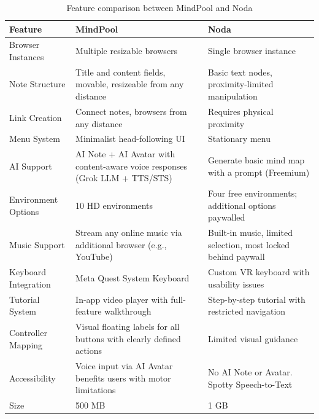 \documentclass{CPP}
\begin{document}
\begin{table}[h]
    \centering
    \caption{Feature comparison between MindPool and Noda}
    \label{tab:noda-comparison}
    \begin{tabular}{|p{3cm}|p{7cm}|p{5cm}|}
        \hline
        \textbf{Feature} & \textbf{MindPool} & \textbf{Noda} \\
        \hline
        Browser Instances & Multiple resizable browsers & Single browser instance \\
        \hline
        Note Structure & Title and content fields, movable, resizeable from any distance & Basic text nodes, proximity-limited manipulation \\
        \hline
        Link Creation & Connect notes, browsers from any distance & Requires physical proximity \\
        \hline
        Menu System & Minimalist head-following UI & Stationary menu \\
        \hline
        AI Support & AI Note + AI Avatar with content-aware voice responses (Grok LLM + TTS/STS) & Generate basic mind map with a prompt (Freemium) \\
        \hline
        Environment Options & 10 HD environments & Four free environments; additional options paywalled \\
        \hline
        Music Support & Stream any online music via additional browser (e.g., YouTube) & Built-in music, limited selection, most locked behind paywall \\
        \hline
        Keyboard Integration & Meta Quest System Keyboard & Custom VR keyboard with usability issues \\
        \hline
        Tutorial System & In-app video player with full-feature walkthrough & Step-by-step tutorial with restricted navigation \\
        \hline
        Controller Mapping & Visual floating labels for all buttons with clearly defined actions & Limited visual guidance \\
        \hline
        Accessibility & Voice input via AI Avatar benefits users with motor limitations & No AI Note or Avatar. Spotty Speech-to-Text \\
        \hline
        Size & 500 MB & 1 GB \\
        \hline
    \end{tabular}
\end{table}
\end{document}
